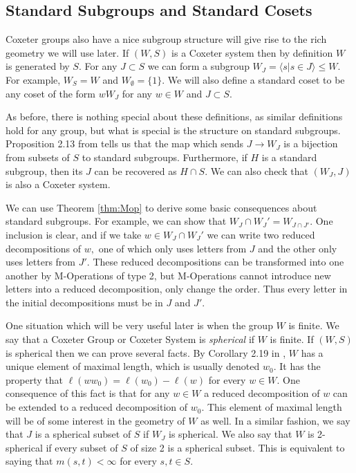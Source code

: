 \documentclass[class=book, crop=false,12 pt]{standalone}
\begin{document}
\subsection{Standard Subgroups and Standard Cosets}
Coxeter groups also have a nice subgroup structure will give rise to the rich geometry we will use later. If $(W,S)$ is a Coxeter system then by definition $W$ is generated by $S.$ For any $J\subset S$ we can form a subgroup $W_J=\langle s|s\in J\rangle\le W.$ For example, $W_S=W$ and $W_{\emptyset}=\{1\}.$ We will also define a standard coset to be any coset of the form $wW_J$ for any $w\in W$ and $J\subset S.$

As before, there is nothing special about these definitions, as similar definitions hold for any group, but what is special is the structure on standard subgroups. Proposition 2.13 from \cite{buildings} tells us that the map which sends $J\to W_J$ is a bijection from subsets of $S$ to standard subgroups. Furthermore, if $H$ is a standard subgroup, then its $J$ can be recovered as $H\cap S.$ We can also check that $(W_J,J)$ is also a Coxeter system.

We can use Theorem \ref{thm:Mop} to derive some basic consequences about standard subgroups. For example, we can show that $W_J\cap W_J'=W_{J\cap J'}.$ One inclusion is clear, and if we take $w\in W_J\cap W_J'$ we can write two reduced decompositions of $w,$ one of which only uses letters from $J$ and the other only uses letters from $J'.$ These reduced decompositions can be transformed into one another by M-Operations of type 2, but M-Operations cannot introduce new letters into a reduced decomposition, only change the order. Thus every letter in the initial decompositions must be in $J$ and $J'.$

One situation which will be very useful later is when the group $W$ is finite. We say that a Coxeter Group or Coxeter System is \emph{spherical} if $W$ is finite. If $(W,S)$ is spherical then we can prove several facts. By Corollary 2.19 in \cite{buildings}, $W$ has a unique element of maximal length, which is usually denoted $w_0.$ It has the property that $\ell(ww_0)=\ell(w_0)-\ell(w)$ for every $w\in W.$ One consequence of this fact is that for any $w\in W$ a reduced decomposition of $w$ can be extended to a reduced decomposition of $w_0.$ This element of maximal length will be of some interest in the geometry of $W$ as well. In a similar fashion, we say that $J$ is a spherical subset of $S$ if $W_J$ is spherical. We also say that $W$ is 2-spherical if every subset of $S$ of size 2 is a spherical subset. This is equivalent to saying that $m(s,t)<\infty$ for every $s,t\in S.$
\end{document}
